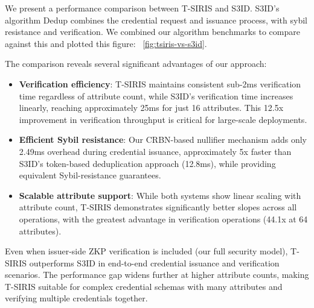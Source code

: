 We present a performance comparison between T-SIRIS and S3ID. S3ID's algorithm Dedup combines the credential request and issuance process, with sybil resistance and verification. We combined our algorithm benchmarks to compare against this and plotted this figure: ~\ref{fig:tsiris-vs-s3id}.

The comparison reveals several significant advantages of our approach:

\begin{itemize}
    
    \item \textbf{Verification efficiency}: T-SIRIS maintains consistent sub-2ms verification time regardless of attribute count, while S3ID's verification time increases linearly, reaching approximately 25ms for just 16 attributes. This 12.5x improvement in verification throughput is critical for large-scale deployments.
    
    \item \textbf{Efficient Sybil resistance}: Our CRBN-based nullifier mechanism adds only 2.49ms overhead during credential issuance, approximately 5x faster than S3ID's token-based deduplication approach (12.8ms), while providing equivalent Sybil-resistance guarantees.
    
    \item \textbf{Scalable attribute support}: While both systems show linear scaling with attribute count, T-SIRIS demonstrates significantly better slopes across all operations, with the greatest advantage in verification operations (44.1x at 64 attributes).
\end{itemize}

Even when issuer-side ZKP verification is included (our full security model), T-SIRIS outperforms S3ID in end-to-end credential issuance and verification scenarios. The performance gap widens further at higher attribute counts, making T-SIRIS suitable for complex credential schemas with many attributes and verifying multiple credentials together.



